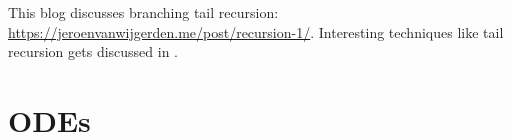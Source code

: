 \documentclass[a4paper,12pt]{article}
\begin{document}

%


\begin{related}
    This blog discusses branching tail recursion:
    \url{https://jeroenvanwijgerden.me/post/recursion-1/}.
    Interesting techniques  like tail recursion  gets discussed in \cite{vicini_path_2021}.
\end{related}


\section{ODEs}

%
%
\end{document}
